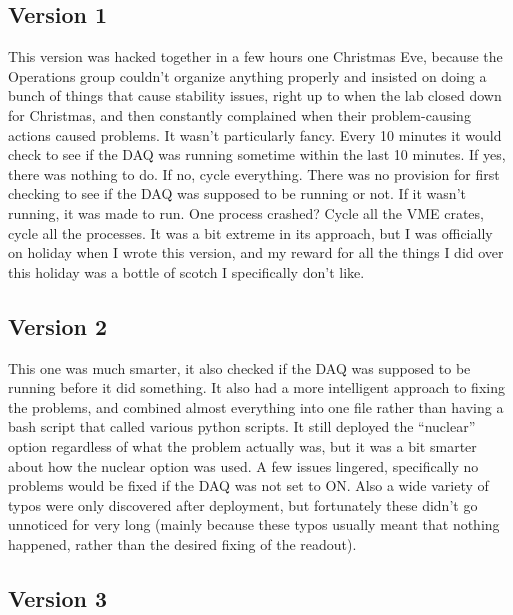 \subsection{Version 1}

This version was hacked together in a few hours one Christmas Eve, because the Operations group couldn't organize anything properly and insisted on doing a bunch of things that cause stability issues, right up to when the lab closed down for Christmas, and then constantly complained when their problem-causing actions caused problems.
It wasn't particularly fancy.
Every 10 minutes it would check to see if the DAQ was running sometime within the last 10 minutes.
If yes, there was nothing to do.
If no, cycle everything.
There was no provision for first checking to see if the DAQ was supposed to be running or not.
If it wasn't running, it was made to run.
One process crashed?
Cycle all the VME crates, cycle all the processes.
It was a bit extreme in its approach, but I was officially on holiday when I wrote this version, and my reward for all the things I did over this holiday was a bottle of scotch I specifically don't like.

\subsection{Version 2}

This one was much smarter, it also checked if the DAQ was supposed to be running before it did something.
It also had a more intelligent approach to fixing the problems, and combined almost everything into one file rather than having a bash script that called various python scripts.
It still deployed the ``nuclear'' option regardless of what the problem actually was, but it was a bit smarter about how the nuclear option was used.
A few issues lingered, specifically no problems would be fixed if the DAQ was not set to ON.
Also a wide variety of typos were only discovered after deployment, but fortunately these didn't go unnoticed for very long (mainly because these typos usually meant that nothing happened, rather than the desired fixing of the readout).

\subsection{Version 3}

